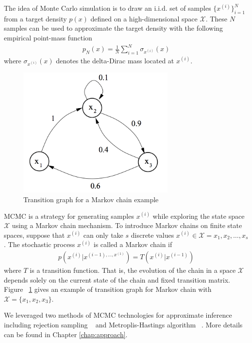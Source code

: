 The idea of Monte Carlo simulation is to draw an i.i.d. set of samples $\{x^{(i)}\}_{i = 1}^N$ from a target density $p(x)$ defined on a high-dimensional space $\mathscr{X}$. These $N$ samples can be used to approximate the target density with the following empirical point-mass function
\begin{align*}
  p_N(x) = \frac{1}{N} \sum_{i = 1}^N \sigma_{x^{(i)}}(x)
\end{align*}
where $\sigma_{x^{(i)}}(x)$ denotes the delta-Dirac mass located at $x^{(i)}$.

\begin{figure}
    \centering
    \includegraphics[width=0.7\textwidth]{figures/mcmc.png}
    \caption{Transition graph for a Markov chain example}
    \label{fig:mcmc}
\end{figure}

MCMC is a strategy for generating samples $x^{(i)}$ while exploring the state space $\mathscr{X}$ using a Markov chain mechanism. To introduce Markov chains on finite state spaces, suppose that $x^{(i)}$ can only take $s$ discrete values $x^{(i)} \in \mathscr{X} = { x_1, x_2, \dots, x_s}$. The stochastic process $x^{(i)}$ is called a Markov chain if
\begin{align*}
  p(x^{(i)} | x^{(i - 1), \dots, x^{(1)}}) = T(x^{(i)} | x^{(i - 1)})
\end{align*}
where $T$ is a transition function. That is, the evolution of the chain in a space $\mathscr{X}$ depends solely on the current state of the chain and fixed transition matrix. Figure ~\ref{fig:mcmc} gives an example of transition graph for Markov chain with $\mathscr{X} = \{x_1, x_2, x_3\}$.
 
We leveraged two methods of MCMC technologies for approximate inference including rejection sampling ~\cite{reject} and Metroplis-Hastings algorithm ~\cite{mh}. More details can be found in Chapter \ref{chap:approach}.

